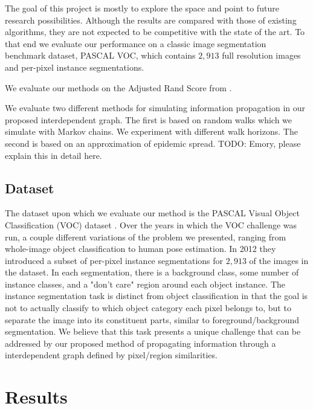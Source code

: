 \documentclass[twocolumn]{article}
\newcommand{\todo}[1]{}
\renewcommand{\todo}[1]{{\color{red} TODO: {#1}}}
\newcommand{\seclab}[1]{\label{sec:#1}}
\begin{document}
The goal of this project is mostly to explore the space and point to future
research possibilities. Although the results are compared with those of
existing algorithms, they are not expected to be competitive with the state of
the art. To that end we evaluate our performance on a classic image segmentation
benchmark dataset, PASCAL VOC, which contains $2,913$ full resolution images and
per-pixel instance segmentations.

We evaluate our methods on the Adjusted Rand Score from
\cite{unnikrishnan2005measure}.  

We evaluate two different methods for simulating information propagation in our
proposed interdependent graph. The first is based on random walks which we
simulate with Markov chains. We experiment with different walk horizons. The
second is based on an approximation of epidemic spread. \todo{Emory, please
explain this in detail here.}

\subsection{Dataset}\seclab{data}

The dataset upon which we evaluate our method is the PASCAL Visual Object
Classification (VOC) dataset \cite{Everingham10}. Over the years in which the
VOC challenge was run, a couple different variations of the problem we
presented, ranging from whole-image object classification to human pose
estimation. In 2012 they introduced a subset of per-pixel instance segmentations
for $2,913$ of the images in the dataset. In each segmentation, there is a
background class, some number of instance classes, and a "don't care" region
around each object instance. The instance segmentation task is distinct from
object classification in that the goal is not to actually classify to which
object category each pixel belongs to, but to separate the image into its
constituent parts, similar to foreground/background segmentation. We believe
that this task presents a unique challenge that can be addressed by our proposed
method of propagating information through a interdependent graph defined by
pixel/region similarities.

\section{Results}\seclab{results}
\end{document}
